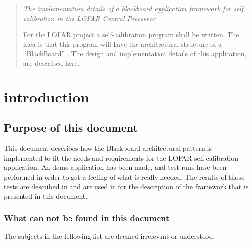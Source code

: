 \documentclass[]{lofar}
\begin{document}
  \maketitle

  \begin{abstract}

    \em{The implementation details of a blackboard application
      framework for self calibration in the LOFAR Central Processor}

    For the LOFAR project a self-calibration program shall be
    written. The idea is that this program will have the architectural
    structure of a ``BlackBoard'' . The design and implementation details
    of this application, are described here.

  \end{abstract}

  \tableofcontents

  \listoffigures


  \section{introduction}
  \label{sec:introduction}\hypertarget{sec:introduction}{}

    \subsection{Purpose of this document}
    \label{subsec:purpose}\hypertarget{subsec:purpose}{}

      This document describes how the Blackboard
       architectural pattern
      is implemented to fit the needs and requirements for the LOFAR
      self-calibration application. An demo application has been made,
      and test-runs have been performed in order to get a feeling of
      what is really needed. The results of those tests are described
      in \cite{bib:LOFAR-ASTRON-MEM-096} and are used in
      for the description of the framework that is presented in this
      document.

      \subsubsection{What can not be found in this document}

        The subjects in the following list are deemed irrelevant or
        understood.
\end{document}
